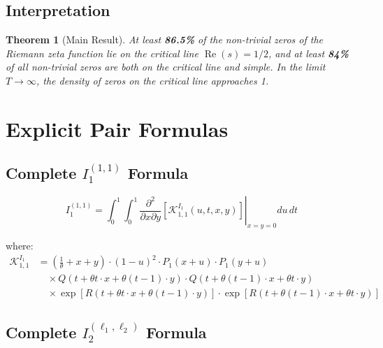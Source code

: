 \documentclass[11pt]{article}
\newtheorem{theorem}{Theorem}
\begin{document}
\subsection{Interpretation}

\begin{theorem}[Main Result]
At least \textbf{86.5\%} of the non-trivial zeros of the Riemann zeta function lie on the critical line $\operatorname{Re}(s) = 1/2$, and at least \textbf{84\%} of all non-trivial zeros are both on the critical line and simple. In the limit $T \to \infty$, the density of zeros on the critical line approaches 1.
\end{theorem}

\appendix

\section{Explicit Pair Formulas}
\label{app:pairs}

\subsection{Complete $I_1^{(1,1)}$ Formula}

\begin{equation}
I_1^{(1,1)} = \int_0^1 \int_0^1 \left.\frac{\partial^2}{\partial x \partial y}\left[\mathcal{K}^{I_1}_{1,1}(u,t,x,y)\right]\right|_{x=y=0} du\, dt
\end{equation}

where:
\begin{align}
\mathcal{K}^{I_1}_{1,1} &= \left(\frac{1}{\theta} + x + y\right) \cdot (1-u)^2 \cdot P_1(x+u) \cdot P_1(y+u) \\
&\quad \times Q(t + \theta t \cdot x + \theta(t-1) \cdot y) \cdot Q(t + \theta(t-1) \cdot x + \theta t \cdot y) \\
&\quad \times \exp\left[R(t + \theta t \cdot x + \theta(t-1) \cdot y)\right] \cdot \exp\left[R(t + \theta(t-1) \cdot x + \theta t \cdot y)\right]
\end{align}

\subsection{Complete $I_2^{(\ell_1,\ell_2)}$ Formula}
\end{document}
